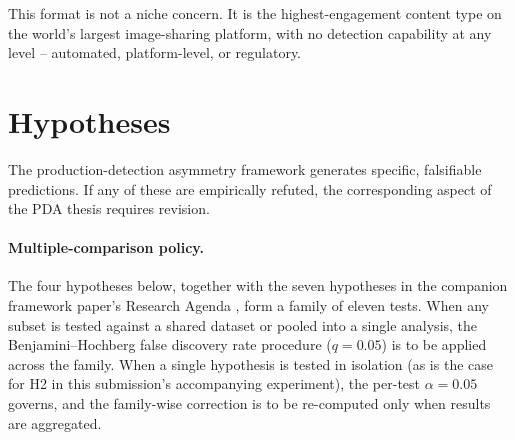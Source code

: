 \documentclass[12pt]{article}
\begin{document}
This format is not a niche concern. It is the highest-engagement content type on the world's largest image-sharing platform, with no detection capability at any level -- automated, platform-level, or regulatory.

\section{Hypotheses}

The production-detection asymmetry framework generates specific, falsifiable predictions. If any of these are empirically refuted, the corresponding aspect of the PDA thesis requires revision.

\paragraph{Multiple-comparison policy.} The four hypotheses below, together with the seven hypotheses in the companion framework paper's Research Agenda \cite{author2026amsm}, form a family of eleven tests. When any subset is tested against a shared dataset or pooled into a single analysis, the Benjamini--Hochberg false discovery rate procedure ($q = 0.05$) is to be applied across the family. When a single hypothesis is tested in isolation (as is the case for H2 in this submission's accompanying experiment), the per-test $\alpha = 0.05$ governs, and the family-wise correction is to be re-computed only when results are aggregated.
\end{document}
